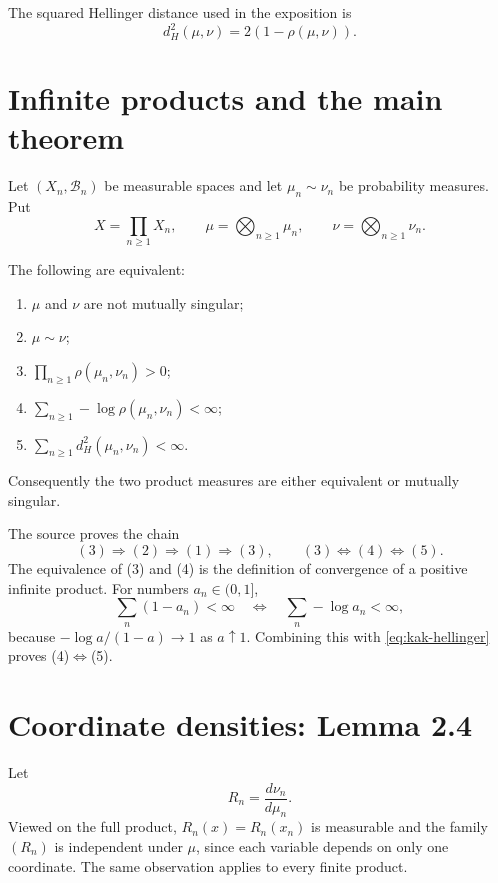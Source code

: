 The squared Hellinger distance used in the exposition is
\begin{equation}\label{eq:kak-hellinger}
 d_H^2(\mu,\nu)=2(1-\rho(\mu,\nu)).
\end{equation}

\section{Infinite products and the main theorem}
Let \((X_n,\mathcal B_n)\) be measurable spaces and let \(\mu_n\sim\nu_n\) be probability
measures.  Put
\[
 X=\prod_{n\ge1}X_n,
 \qquad
 \mu=\bigotimes_{n\ge1}\mu_n,
 \qquad
 \nu=\bigotimes_{n\ge1}\nu_n.
\]

\begin{theorem}
The following are equivalent:
\begin{enumerate}[leftmargin=2em]
\item \(\mu\) and \(\nu\) are not mutually singular;
\item \(\mu\sim\nu\);
\item \(\prod_{n\ge1}\rho(\mu_n,\nu_n)>0\);
\item \(\sum_{n\ge1}-\log\rho(\mu_n,\nu_n)<\infty\);
\item \(\sum_{n\ge1}d_H^2(\mu_n,\nu_n)<\infty\).
\end{enumerate}
Consequently the two product measures are either equivalent or mutually singular.
\end{theorem}

The source proves the chain
\[
 (3)\Longrightarrow(2)\Longrightarrow(1)\Longrightarrow(3),
 \qquad
 (3)\Longleftrightarrow(4)\Longleftrightarrow(5).
\]
The equivalence of (3) and (4) is the definition of convergence of a positive infinite product.
For numbers \(a_n\in(0,1]\),
\[
 \sum_n(1-a_n)<\infty
 \quad\Longleftrightarrow\quad
 \sum_n-\log a_n<\infty,
\]
because \(-\log a/(1-a)\to1\) as \(a\uparrow1\).  Combining this with
\eqref{eq:kak-hellinger} proves (4)\(\Leftrightarrow\)(5).

\section{Coordinate densities: Lemma 2.4}
Let
\begin{equation}\label{eq:kak-Rn}
 R_n=\frac{d\nu_n}{d\mu_n}.
\end{equation}
Viewed on the full product, \(R_n(x)=R_n(x_n)\) is measurable and the family
\((R_n)\) is independent under \(\mu\), since each variable depends on only one coordinate.
The same observation applies to every finite product.

